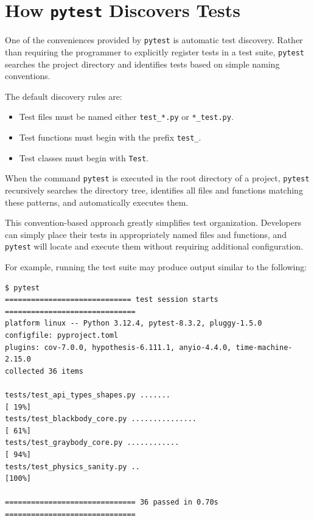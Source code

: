 \section{How \texttt{pytest} Discovers Tests}

One of the conveniences provided by \texttt{pytest} is automatic test discovery. Rather than requiring the programmer to explicitly register tests in a test suite, \texttt{pytest} searches the project directory and identifies tests based on simple naming conventions.

The default discovery rules are:

\begin{itemize}
\item Test files must be named either \texttt{test\_*.py} or \texttt{*\_test.py}.
\item Test functions must begin with the prefix \texttt{test\_}.
\item Test classes must begin with \texttt{Test}.
\end{itemize}

When the command \texttt{pytest} is executed in the root directory of a project, \texttt{pytest} recursively searches the directory tree, identifies all files and functions matching these patterns, and automatically executes them.

This convention-based approach greatly simplifies test organization. Developers can simply place their tests in appropriately named files and functions, and \texttt{pytest} will locate and execute them without requiring additional configuration.

For example, running the test suite may produce output similar to the following:

\begin{verbatim}
$ pytest
============================= test session starts ==============================
platform linux -- Python 3.12.4, pytest-8.3.2, pluggy-1.5.0
configfile: pyproject.toml
plugins: cov-7.0.0, hypothesis-6.111.1, anyio-4.4.0, time-machine-2.15.0
collected 36 items                                                             

tests/test_api_types_shapes.py .......                                   [ 19%]
tests/test_blackbody_core.py ...............                             [ 61%]
tests/test_graybody_core.py ............                                 [ 94%]
tests/test_physics_sanity.py ..                                          [100%]

============================== 36 passed in 0.70s ==============================
\end{verbatim}

